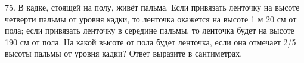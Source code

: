 75. В кадке, стоящей на полу, живёт пальма. Если привязать ленточку на высоте четверти пальмы от уровня кадки, то ленточка окажется на высоте 1 м 20 см от пола; если привязать ленточку в середине пальмы, то ленточка будет на высоте 190 см от пола. На какой высоте от пола будет ленточка, если она отмечает 2/5 высоты пальмы от уровня кадки? Ответ выразите в сантиметрах.\\
